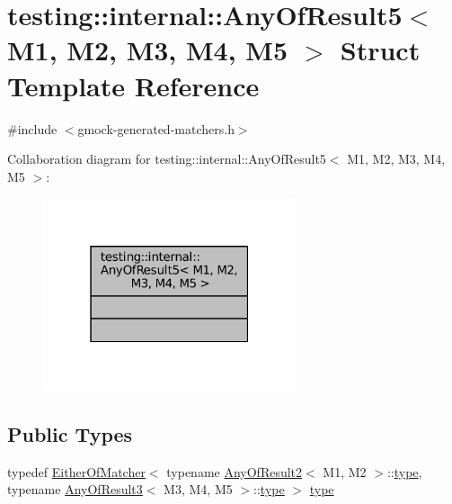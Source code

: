 \hypertarget{structtesting_1_1internal_1_1AnyOfResult5}{}\section{testing\+:\+:internal\+:\+:Any\+Of\+Result5$<$ M1, M2, M3, M4, M5 $>$ Struct Template Reference}
\label{structtesting_1_1internal_1_1AnyOfResult5}


{\ttfamily \#include $<$gmock-\/generated-\/matchers.\+h$>$}



Collaboration diagram for testing\+:\+:internal\+:\+:Any\+Of\+Result5$<$ M1, M2, M3, M4, M5 $>$\+:
\nopagebreak
\begin{figure}[H]
\begin{center}
\leavevmode
\includegraphics[width=211pt]{structtesting_1_1internal_1_1AnyOfResult5__coll__graph}
\end{center}
\end{figure}
\subsection*{Public Types}
\begin{DoxyCompactItemize}
\item 
typedef \hyperlink{classtesting_1_1internal_1_1EitherOfMatcher}{Either\+Of\+Matcher}$<$ typename \hyperlink{structtesting_1_1internal_1_1AnyOfResult2}{Any\+Of\+Result2}$<$ M1, M2 $>$\+::\hyperlink{structtesting_1_1internal_1_1AnyOfResult5_a459a06dc5791313dce942668714f0c99}{type}, typename \hyperlink{structtesting_1_1internal_1_1AnyOfResult3}{Any\+Of\+Result3}$<$ M3, M4, M5 $>$\+::\hyperlink{structtesting_1_1internal_1_1AnyOfResult5_a459a06dc5791313dce942668714f0c99}{type} $>$ \hyperlink{structtesting_1_1internal_1_1AnyOfResult5_a459a06dc5791313dce942668714f0c99}{type}
\end{DoxyCompactItemize}


